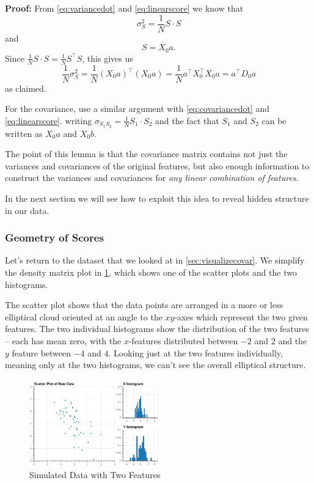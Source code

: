 \documentclass[
]{article}
\begin{document}
\textbf{Proof:} From \cref{eq:variancedot} and \ref{eq:linearscore} we
know that \[
\sigma_{S}^2 = \frac{1}{N}S\cdot S
\] and \[
S = X_{0}a.
\] Since \(\frac{1}{N}S\cdot S = \frac{1}{N}S^{\intercal}S\), this gives
us \[
\frac{1}{N}\sigma_{S}^2 = \frac{1}{N}(X_{0}a)^{\intercal}(X_{0}a) = \frac{1}{N}a^{\intercal}X_{0}^{\intercal}X_{0}a = a^{\intercal}D_{0}a
\] as claimed.

For the covariance, use a similar argument with \cref{eq:covariancedot}
and \cref{eq:linearscore}. writing
\(\sigma_{S_{1}S_{2}}=\frac{1}{N}S_{1}\cdot S_{2}\) and the fact that
\(S_{1}\) and \(S_{2}\) can be written as \(X_{0}a\) and \(X_{0}b\).

The point of this lemma is that the covariance matrix contains not just
the variances and covariances of the original features, but also enough
information to construct the variances and covariances for \emph{any
linear combination of features.}

In the next section we will see how to exploit this idea to reveal
hidden structure in our data.

\hypertarget{geometry-of-scores}{%
\subsubsection{Geometry of Scores}\label{geometry-of-scores}}

Let's return to the dataset that we looked at in
\cref{sec:visualizecovar}. We simplify the density matrix plot in
\cref{fig:pcasimfig}, which shows one of the scatter plots and the two
histograms.

The scatter plot shows that the data points are arranged in a more or
less elliptical cloud oriented at an angle to the \(xy\)-axes which
represent the two given features. The two individual histograms show the
distribution of the two features -- each has mean zero, with the
\(x\)-features distributed between \(-2\) and \(2\) and the \(y\)
feature between \(-4\) and \(4\). Looking just at the two features
individually, meaning only at the two histograms, we can't see the
overall elliptical structure.

\begin{figure}
\hypertarget{fig:pcasimfig}{%
\centering
\includegraphics[width=0.5\textwidth,height=\textheight]{../img/PCAsimulated-1.png}
\caption{Simulated Data with Two Features}\label{fig:pcasimfig}
}
\end{figure}
\end{document}
